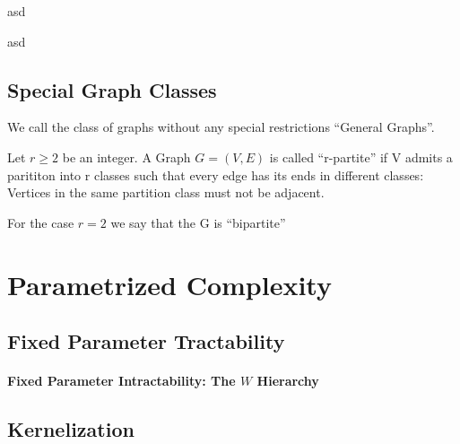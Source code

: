 \begin{definition}
    asd
\end{definition}

\begin{definition}
    asd
\end{definition}

\subsection*{Special Graph Classes}
We call the class of graphs without any special restrictions ``General Graphs''.

\begin{definition}
    Let $r \geq 2$ be an integer. A Graph $G = (V,E)$ is called ``r-partite'' if V admits a parititon into r classes such that every edge has its ends in different classes: Vertices in the same partition class must not be adjacent. 
    
    For the case $r = 2$ we say that the G is ``bipartite'' 

\end{definition}

\begin{definition}
    
\end{definition}

\begin{definition}
    
\end{definition}


\section{Parametrized Complexity}

\subsection{Fixed Parameter Tractability}
\paragraph{Fixed Parameter Intractability: The \hmath $W$ Hierarchy}
\subsection{Kernelization}


